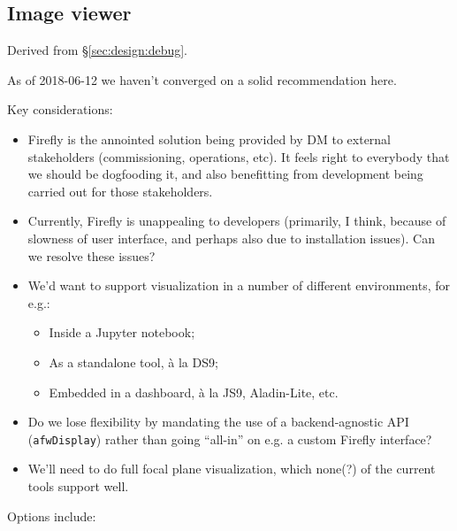 \subsection{Image viewer}


Derived from \S\ref{sec:design:debug}.

As of 2018-06-12 we haven't converged on a solid recommendation here.

Key considerations:

\begin{itemize}

  \item{Firefly is the annointed solution being provided by DM to external
  stakeholders (commissioning, operations, etc). It feels right to everybody
  that we should be dogfooding it, and also benefitting from development being
  carried out for those stakeholders.}

  \item{Currently, Firefly is unappealing to developers (primarily, I think,
  because of slowness of user interface, and perhaps also due to installation
  issues). Can we resolve these issues?}

  \item{We'd want to support visualization in a number of different
  environments, for e.g.:

    \begin{itemize}

      \item{Inside a Jupyter notebook;}
      \item{As a standalone tool, \`a la DS9;}
      \item{Embedded in a \gls{dashboard}, \`a la JS9, Aladin-Lite, etc.}

    \end{itemize}
  }

  \item{Do we lose flexibility by mandating the use of a backend-agnostic API
  (\texttt{afwDisplay}) rather than going ``all-in'' on e.g. a custom Firefly
  interface?}

  \item{We'll need to do full focal plane visualization, which none(?) of the
  current tools support well.}

\end{itemize}

Options include:

